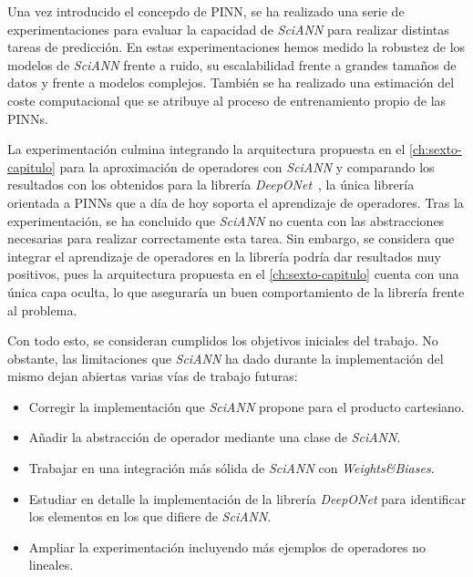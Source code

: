 Una vez introducido el concepdo de PINN, se ha realizado una serie de experimentaciones para evaluar la capacidad de  \textit{SciANN} para realizar distintas tareas de predicción. En estas experimentaciones hemos medido la robustez de los modelos de  \textit{SciANN} frente a ruido, su escalabilidad frente a grandes tamaños de datos y frente a modelos complejos. También se ha realizado una estimación del coste computacional que se atribuye al proceso de entrenamiento propio de las PINNs. 

La experimentación culmina integrando la arquitectura propuesta en el \autoref{ch:sexto-capitulo} para la aproximación de operadores con \textit{SciANN} y comparando los resultados con los obtenidos para la librería \textit{DeepONet}~\cite{lu2024deeponet}, la única librería orientada a PINNs que a día de hoy soporta el aprendizaje de operadores. Tras la experimentación, se ha concluido que \textit{SciANN} no cuenta con las abstracciones necesarias para realizar correctamente esta tarea. Sin embargo, se considera que integrar el aprendizaje de operadores en la librería podría dar resultados muy positivos, pues la arquitectura propuesta en el \autoref{ch:sexto-capitulo} cuenta con una única capa oculta, lo que aseguraría un buen comportamiento de la librería frente al problema. 

Con todo esto, se consideran cumplidos los objetivos iniciales del trabajo. No obstante, las limitaciones que  \textit{SciANN} ha dado durante la implementación del mismo dejan abiertas varias vías de trabajo futuras:

\begin{itemize}
    \item Corregir la implementación que \textit{SciANN} propone para el producto cartesiano.
    \item Añadir la abstracción de operador mediante una clase de \textit{SciANN}.
    \item Trabajar en una integración más sólida de \textit{SciANN} con \textit{Weights\&{Biases}}. 
    \item Estudiar en detalle la implementación de la librería \textit{DeepONet} para identificar los elementos en los que difiere de \textit{SciANN}.
    \item Ampliar la experimentación incluyendo más ejemplos de operadores no lineales. 
\end{itemize}